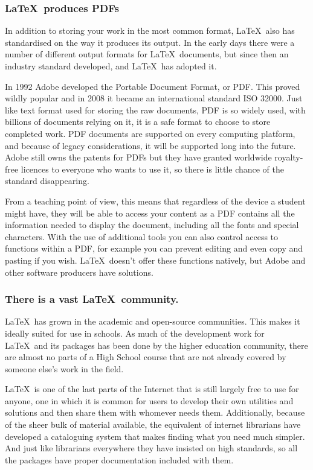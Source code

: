 \documentclass[12pt]{extarticle}
\begin{document}
\subsubsection{\LaTeX\ produces PDFs}
In addition to storing your work in the most common format, \LaTeX\ also has standardised on the way it produces its output. In the early days there were a number of different output formats for \LaTeX\ documents, but since then an industry standard developed, and \LaTeX\ has adopted it.

In 1992 Adobe developed the Portable Document Format, or PDF. This proved wildly popular and in 2008 it became an international standard ISO 32000. Just like text format used for storing the raw documents, PDF is so widely used, with billions of documents relying on it, it is a safe format to choose to store completed work. PDF documents are supported on every computing platform, and because of legacy considerations, it will be supported long into the future. Adobe still owns the patents for PDFs but they have granted worldwide royalty-free licences to everyone who wants to use it, so there is little chance of the standard disappearing.

From a teaching point of view, this means that regardless of the device a student might have, they will be able to access your content as a PDF contains all the information needed to display the document, including all the fonts and special characters. With the use of additional tools you can also control access to functions within a PDF, for example you can prevent editing and even copy and pasting if you wish. \LaTeX\ doesn't offer these functions natively, but Adobe and other software producers have solutions.

\subsubsection{There is a vast \LaTeX\ community.}
\LaTeX\ has grown in the academic and open-source communities. This makes it ideally suited for use in schools. As much of the development work for \LaTeX\ and its packages has been done by the higher education community, there are almost no parts of a High School course that are not already covered by someone else's work in the field.

\LaTeX\ is one of the last parts of the Internet that is still largely free to use for anyone, one in which it is common for users to develop their own utilities and solutions and then share them with whomever needs them. Additionally, because of the sheer bulk of material available, the equivalent of internet librarians have developed a cataloguing system that makes finding what you need much simpler. And just like librarians everywhere they have insisted on high standards, so all the packages have proper documentation included with them.
\end{document}

